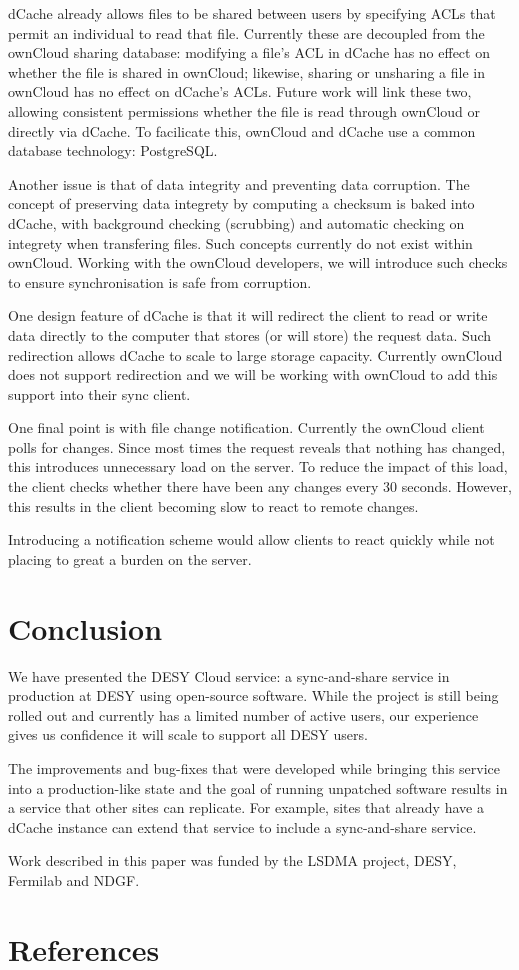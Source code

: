 \documentclass[a4paper]{jpconf}
\begin{document}
dCache already allows files to be shared between users by specifying
ACLs that permit an individual to read that file.  Currently these are
decoupled from the ownCloud sharing database: modifying a file's ACL
in dCache has no effect on whether the file is shared in ownCloud;
likewise, sharing or unsharing a file in ownCloud has no effect on
dCache's ACLs.  Future work will link these two, allowing consistent
permissions whether the file is read through ownCloud or directly via
dCache.  To facilicate this, ownCloud and dCache use a common database
technology: PostgreSQL.

Another issue is that of data integrity and preventing data
corruption.  The concept of preserving data integrety by computing a
checksum is baked into dCache, with background checking (scrubbing)
and automatic checking on integrety when transfering files.  Such
concepts currently do not exist within ownCloud.  Working with the
ownCloud developers, we will introduce such checks to ensure
synchronisation is safe from corruption.

One design feature of dCache is that it will redirect the client to
read or write data directly to the computer that stores (or will
store) the request data.  Such redirection allows dCache to scale to
large storage capacity.  Currently ownCloud does not support
redirection and we will be working with ownCloud to add this support
into their sync client.

One final point is with file change notification.  Currently the
ownCloud client polls for changes.  Since most times the request
reveals that nothing has changed, this introduces unnecessary load on
the server.  To reduce the impact of this load, the client checks
whether there have been any changes every 30 seconds.  However, this
results in the client becoming slow to react to remote changes.

Introducing a notification scheme would allow clients to react quickly
while not placing to great a burden on the server.

\section{Conclusion}

We have presented the DESY Cloud service: a sync-and-share service in
production at DESY using open-source software.  While the project is
still being rolled out and currently has a limited number of active
users, our experience gives us confidence it will scale to support all
DESY users.

The improvements and bug-fixes that were developed while bringing this
service into a production-like state and the goal of running unpatched
software results in a service that other sites can replicate.  For
example, sites that already have a dCache instance can extend that
service to include a sync-and-share service.

\ack

Work described in this paper was funded by the LSDMA project, DESY,
Fermilab and NDGF.

\section*{References}

\end{document}
